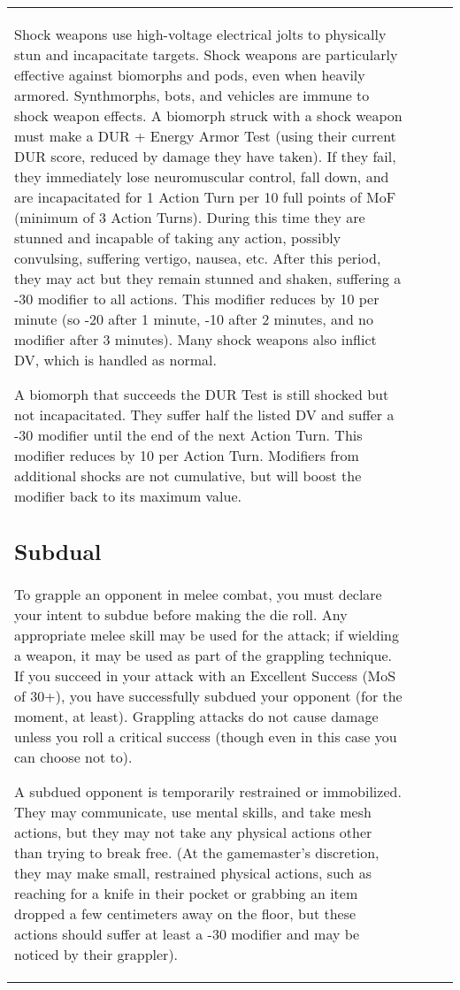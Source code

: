 \begin{table}
\begin{tabular}{|p{8cm}|r|r|r|}
Shock weapons use high-voltage electrical jolts to physically stun and incapacitate targets. Shock weapons are particularly effective against biomorphs and pods, even when heavily armored. Synthmorphs, bots, and vehicles are immune to shock weapon effects. A biomorph struck with a shock weapon must make a DUR + Energy Armor Test (using their current DUR score, reduced by damage they have taken). If they fail, they immediately lose neuromuscular control, fall down, and are incapacitated for 1 Action Turn per 10 full points of MoF (minimum of 3 Action Turns). During this time they are stunned and incapable of taking any action, possibly convulsing, suffering vertigo, nausea, etc. After this period, they may act but they remain stunned and shaken, suffering a -30 modifier to all actions. This modifier reduces by 10 per minute (so -20 after 1 minute, -10 after 2 minutes, and no modifier after 3 minutes). Many shock weapons also inflict DV, which is handled as normal. 

A biomorph that succeeds the DUR Test is still shocked but not incapacitated. They suffer half the listed DV and suffer a -30 modifier until the end of the next Action Turn. This modifier reduces by 10 per Action Turn. Modifiers from additional shocks are not cumulative, but will boost the modifier back to its maximum value. 



\subsection{Subdual} \label{sec:subdual} 

To grapple an opponent in melee combat, you must declare your intent to subdue before making the die roll. Any appropriate melee skill may be used for the attack; if wielding a weapon, it may be used as part of the grappling technique. If you succeed in your attack with an Excellent Success (MoS of 30+), you have successfully subdued your opponent (for the moment, at least). Grappling attacks do not cause damage unless you roll a critical success (though even in this case you can choose not to). 

A subdued opponent is temporarily restrained or immobilized. They may communicate, use mental skills, and take mesh actions, but they may not take any physical actions other than trying to break free. (At the gamemaster’s discretion, they may make small, restrained physical actions, such as reaching for a knife in their pocket or grabbing an item dropped a few centimeters away on the floor, but these actions should suffer at least a -30 modifier and may be noticed by their grappler). 


\end{tabular}
\end{table}
